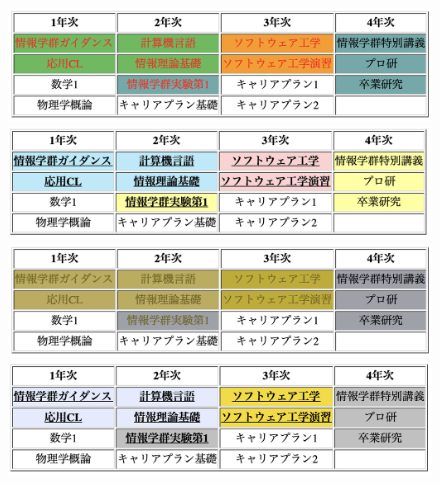 \section{\result}
\begin{figure}[H]
    \centering
    \begin{minipage}{.49\columnwidth}
        \centering
        \includegraphics[keepaspectratio,width=\textwidth]{../../10_UniversalDesign/no1_table_original.png}
    \end{minipage}
    \begin{minipage}{.49\columnwidth}
        \centering
        \includegraphics[keepaspectratio,width=\textwidth]{../../10_UniversalDesign/no1_tableR_original.png}
    \end{minipage}
    \begin{minipage}{.49\columnwidth}
        \centering
        \includegraphics[keepaspectratio,width=\textwidth]{../../10_UniversalDesign/no1_table_OC_P.png}
    \end{minipage}
    \begin{minipage}{.49\columnwidth}
        \centering
        \includegraphics[keepaspectratio,width=\textwidth]{../../10_UniversalDesign/no1_table_RC_P.png}

\end{minipage}
\end{figure}

